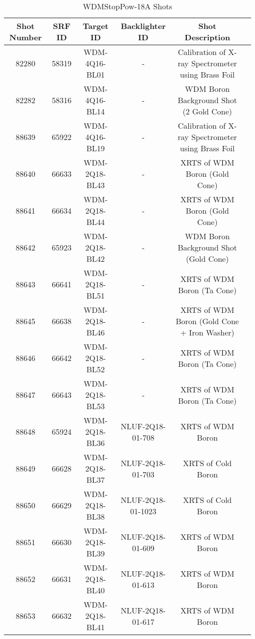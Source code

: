 \begin{sidewaystable}[h!]
    \def\arraystretch{1.5}
    \centering
    \begin{tabular}{c c c c c c}
    Shot Number & SRF ID & Target ID & Backlighter ID & Shot Description \\
    \hline
82280 & 58319 & WDM-4Q16-BL01 & - & Calibration of X-ray Spectrometer using Brass Foil\\
82282 & 58316 & WDM-4Q16-BL14 & - & WDM Boron Background Shot (2 Gold Cone)\\
88639 & 65922 & WDM-4Q16-BL19 & - & Calibration of X-ray Spectrometer using Brass Foil\\
88640 & 66633 & WDM-2Q18-BL43 & - & XRTS of WDM Boron (Gold Cone)\\
88641 & 66634 & WDM-2Q18-BL44 & - & XRTS of WDM Boron (Gold Cone)\\
88642 & 65923 & WDM-2Q18-BL42 & - & WDM Boron Background Shot (Gold Cone)\\
88643 & 66641 & WDM-2Q18-BL51 & - & XRTS of WDM Boron (Ta Cone)\\
88645 & 66638 & WDM-2Q18-BL46 & - & XRTS of WDM Boron (Gold Cone + Iron Washer)\\
88646 & 66642 & WDM-2Q18-BL52 & - & XRTS of WDM Boron (Ta Cone)\\
88647 & 66643 & WDM-2Q18-BL53 & - & XRTS of WDM Boron (Ta Cone)\\
88648 & 65924 & WDM-2Q18-BL36 & NLUF-2Q18-01-708 & XRTS of WDM Boron\\
88649 & 66628 & WDM-2Q18-BL37 & NLUF-2Q18-01-703 & XRTS of Cold Boron\\
88650 & 66629 & WDM-2Q18-BL38 & NLUF-2Q18-01-1023 & XRTS of Cold Boron\\
88651 & 66630 & WDM-2Q18-BL39 & NLUF-2Q18-01-609 & XRTS of WDM Boron\\
88652 & 66631 & WDM-2Q18-BL40 & NLUF-2Q18-01-613 & XRTS of WDM Boron\\
88653 & 66632 & WDM-2Q18-BL41 & NLUF-2Q18-01-617 & XRTS of WDM Boron\\
    \end{tabular}
    \caption{WDMStopPow-18A Shots}
    \label{tab:my_label}
\end{sidewaystable}

